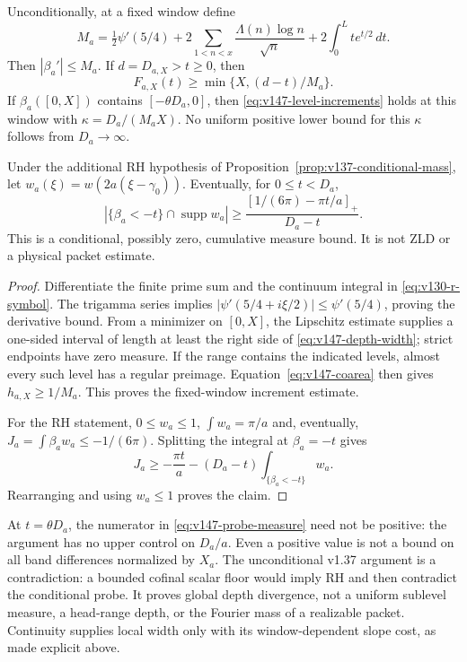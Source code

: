 \begin{proposition}
\label{prop:v147-depth-measure}
Unconditionally, at a fixed window define
\[
 M_a=\tfrac12\psi'(5/4)
       +2\sum_{1<n<x}\frac{\Lambda(n)\log n}{\sqrt n}
       +2\int_0^L t e^{t/2}\,dt.
\]
Then $|\beta_a'|\le M_a$. If $d=D_{a,X}>t\ge0$, then
\begin{equation}\label{eq:v147-depth-width}
 F_{a,X}(t)\ge\min\{X,(d-t)/M_a\}.
\end{equation}
If $\beta_a([0,X])$ contains $[-\theta D_a,0]$, then
\eqref{eq:v147-level-increments} holds at this window with
$\kappa=D_a/(M_aX)$. No uniform positive lower bound for this
$\kappa$ follows from $D_a\to\infty$.

Under the additional RH hypothesis of
Proposition~\ref{prop:v137-conditional-mass}, let
$w_a(\xi)=w(2a(\xi-\gamma_0))$. Eventually, for $0\le t<D_a$,
\begin{equation}\label{eq:v147-probe-measure}
 |\{\beta_a<-t\}\cap\operatorname{supp}w_a|
 \ge\frac{[1/(6\pi)-\pi t/a]_+}{D_a-t}.
\end{equation}
This is a conditional, possibly zero, cumulative measure bound. It
is not ZLD or a physical packet estimate.
\end{proposition}
\begin{proof}
Differentiate the finite prime sum and the continuum integral in
\eqref{eq:v130-r-symbol}. The trigamma series implies
$|\psi'(5/4+i\xi/2)|\le\psi'(5/4)$, proving the derivative bound.
From a minimizer on $[0,X]$, the Lipschitz estimate supplies a
one-sided interval of length at least the right side of
\eqref{eq:v147-depth-width}; strict endpoints have zero measure.
If the range contains the indicated levels, almost every such level
has a regular preimage. Equation~\eqref{eq:v147-coarea} then gives
$h_{a,X}\ge1/M_a$. This proves the fixed-window increment estimate.

For the RH statement, $0\le w_a\le1$, $\int w_a=\pi/a$ and,
eventually, $J_a=\int\beta_aw_a\le-1/(6\pi)$. Splitting the
integral at $\beta_a=-t$ gives
\[
 J_a\ge-\frac{\pi t}{a}
        -(D_a-t)\int_{\{\beta_a<-t\}}w_a.
\]
Rearranging and using $w_a\le1$ proves the claim.
\end{proof}
At $t=\theta D_a$, the numerator in
\eqref{eq:v147-probe-measure} need not be positive: the argument has
no upper control on $D_a/a$. Even a positive value is not a bound on
all band differences normalized by $X_a$. The unconditional v1.37
argument is a contradiction: a bounded cofinal scalar floor would
imply RH and then contradict the conditional probe. It proves global
depth divergence, not a uniform sublevel measure, a head-range depth,
or the Fourier mass of a realizable packet. Continuity supplies local
width only with its window-dependent slope cost, as made explicit above.

